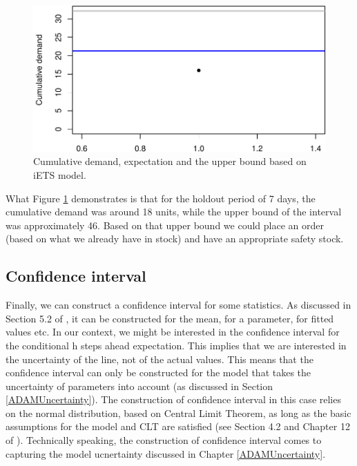 \documentclass[
]{book}
\theoremstyle{definition}
\theoremstyle{definition}
\theoremstyle{definition}
\theoremstyle{definition}
\theoremstyle{remark}
\begin{document}
\begin{figure}
\centering
\includegraphics{adam_files/figure-latex/adamModeliETSCumulative-1.pdf}
\caption{\label{fig:adamModeliETSCumulative}Cumulative demand, expectation and the upper bound based on iETS model.}
\end{figure}

What Figure \ref{fig:adamModeliETSCumulative} demonstrates is that for the holdout period of 7 days, the cumulative demand was around 18 units, while the upper bound of the interval was approximately 46. Based on that upper bound we could place an order (based on what we already have in stock) and have an appropriate safety stock.

\hypertarget{confidence-interval}{%
\subsection{Confidence interval}\label{confidence-interval}}

Finally, we can construct a confidence interval for some statistics. As discussed in Section 5.2 of \citet{SvetunkovSBA}, it can be constructed for the mean, for a parameter, for fitted values etc. In our context, we might be interested in the confidence interval for the conditional h steps ahead expectation. This implies that we are interested in the uncertainty of the line, not of the actual values. This means that the confidence interval can only be constructed for the model that takes the uncertainty of parameters into account (as discussed in Section \ref{ADAMUncertainty}). The construction of confidence interval in this case relies on the normal distribution, based on Central Limit Theorem, as long as the basic assumptions for the model and CLT are satisfied (see Section 4.2 and Chapter 12 of \citet{SvetunkovSBA}). Technically speaking, the construction of confidence interval comes to capturing the model ucnertainty discussed in Chapter \ref{ADAMUncertainty}.
\end{document}
